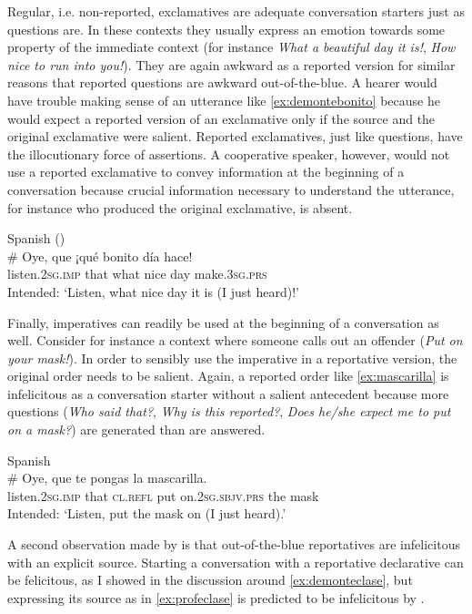 Regular, i.e. non-reported,  exclamatives are adequate conversation starters just as questions are. In these contexts they usually express an emotion towards some property of the immediate context (for instance \emph{What a beautiful day it is!}, \emph{How nice to run into you!}). They are again awkward as a reported version for similar  reasons that reported questions are awkward out-of-the-blue.  A hearer would have trouble making sense of an utterance like \eqref{ex:demontebonito} because he would expect a reported version of an exclamative only if the source and the original exclamative were salient. Reported exclamatives, just like questions, have the illocutionary force of assertions. A cooperative speaker, however, would not use a reported exclamative to convey information at the beginning of a conversation because crucial information necessary to understand the utterance, for instance who produced the original exclamative, is absent.

\ea Spanish (\citealt[18: ex 16a]{DemonteSoriano2014})\label{ex:demontebonito}\\
\gll  \# Oye, que ¡qué bonito día hace!\\
      \phantom{\#}   listen.\textsc{2sg.imp} that what nice day make.\textsc{3sg.prs}\\
\glt \phantom{\#} Intended: `Listen, what nice day it is (I just heard)!'
\z

Finally, imperatives can readily be used at the beginning of a conversation as well. Consider for instance a context where someone calls out an offender (\emph{Put on your mask!}). In order to sensibly use the imperative in a reportative version, the original order needs to be salient. Again, a reported order like \eqref{ex:mascarilla} is infelicitous as a conversation starter without a salient antecedent because more questions (\emph{Who said that?}, \textit{Why is this reported?}, \textit{Does he/she expect me to put on a mask?}) are generated than are answered.

\ea Spanish\label{ex:mascarilla}\\
\gll \#  Oye, que te pongas la mascarilla.\\
     \phantom{\#} listen.\textsc{2sg.imp} that \textsc{cl.refl} {put on}.\textsc{2sg.sbjv.prs} the mask\\
\glt \phantom{\#} Intended: `Listen, put the mask on (I just heard).'
\z

A second observation made by \citet{DemonteSoriano2014}  is  that out-of-the-blue reportatives are infelicitous with an explicit source.  Starting a conversation with a reportative declarative can be felicitous, as I showed in the discussion around \eqref{ex:demonteclase}, but expressing its source as in \eqref{ex:profeclase} is predicted  to be infelicitous by \citet{DemonteSoriano2014}.  

